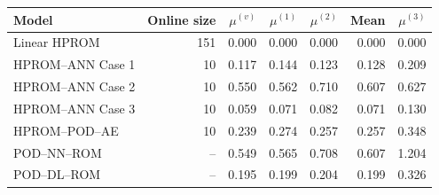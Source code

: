 \begin{tabular}{lr|rrrr|r}
\toprule
Model & Online size & $\mu^{(v)}$ & $\mu^{(1)}$ & $\mu^{(2)}$ & Mean & $\mu^{(3)}$ \\
\midrule
Linear HPROM & 151 & 0.000 & 0.000 & 0.000 & 0.000 & 0.000 \\
HPROM--ANN Case 1 & 10 & 0.117 & 0.144 & 0.123 & 0.128 & 0.209 \\
HPROM--ANN Case 2 & 10 & 0.550 & 0.562 & 0.710 & 0.607 & 0.627 \\
HPROM--ANN Case 3 & 10 & 0.059 & 0.071 & 0.082 & 0.071 & 0.130 \\
HPROM--POD--AE & 10 & 0.239 & 0.274 & 0.257 & 0.257 & 0.348 \\
\midrule
POD--NN--ROM & -- & 0.549 & 0.565 & 0.708 & 0.607 & 1.204 \\
POD--DL--ROM & -- & 0.195 & 0.199 & 0.204 & 0.199 & 0.326 \\
\bottomrule
\end{tabular}
